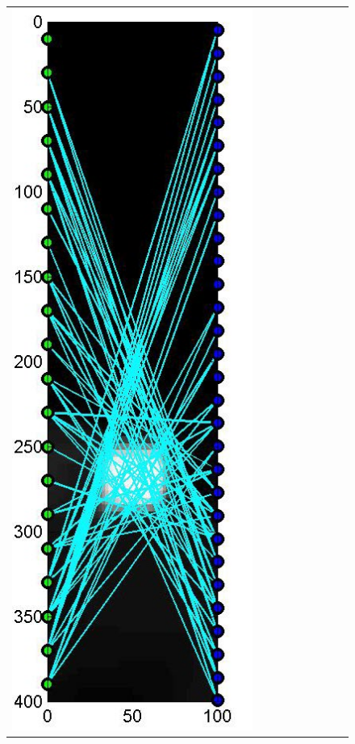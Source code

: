 \documentclass[english]{siamltex}
\begin{document}
{\begin{figure}[!h]
\begin{center}
\begin{tabular}{|c|c|c|c|c|c|c|c|c|}
			\includegraphics[width=.9\iwidth]{figures/newFigs/noisy/resultsExp-6-designs}
			&

\end{tabular}
\end{center}
\end{figure}}
\end{document}

